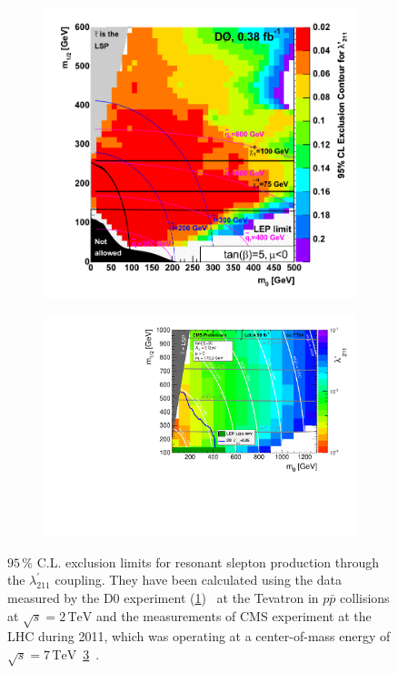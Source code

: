 \begin{figure}[ht!]
  \centering
  \begin{subfigure}[b]{0.77\textwidth}
    \centering
    \includegraphics[width=\textwidth]{plots/auterrpv.pdf}
    \caption{\label{fig:auterrpv}}
  \end{subfigure}
  \begin{subfigure}[b]{0.77\textwidth}
    \centering
    \includegraphics[width=\textwidth]{plots/2011-l211limits_MultiBin_logz-colz.pdf}
    \caption{\label{fig:2011rpv}}
  \end{subfigure}
  \caption{$95\,\%$ C.L. exclusion limits for resonant slepton production through the $\lambda^{\prime}_{211}$ coupling. They have been calculated using the data measured by the D0 experiment (\ref{fig:auterrpv})~\cite{auter} at the Tevatron in $p\bar{p}$ collisions at $\sqrt{s} = 2\,\text{TeV}$ and the measurements of CMS experiment at the LHC during 2011, which was operating at a center-of-mass energy of $\sqrt{s} = 7\,\text{TeV}$~\ref{fig:2011rpv}~\cite{2011rpv}.}
\end{figure}


